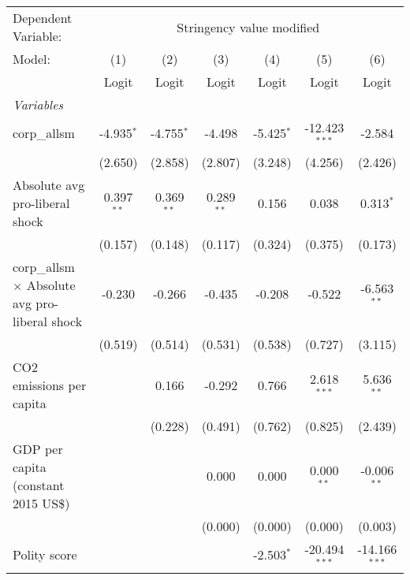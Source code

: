 
\begingroup
\centering
\begin{tabular}{lcccccc}
   \toprule
   Dependent Variable: & \multicolumn{6}{c}{Stringency value modified}\\
   Model:                                                & (1)          & (2)          & (3)          & (4)          & (5)             & (6)\\  
                                                         &  Logit       & Logit        & Logit        & Logit        & Logit           & Logit\\  
   \midrule
   \emph{Variables}\\
   corp\_allsm                                           & -4.935$^{*}$ & -4.755$^{*}$ & -4.498       & -5.425$^{*}$ & -12.423$^{***}$ & -2.584\\   
                                                         & (2.650)      & (2.858)      & (2.807)      & (3.248)      & (4.256)         & (2.426)\\   
   Absolute avg pro-liberal shock                        & 0.397$^{**}$ & 0.369$^{**}$ & 0.289$^{**}$ & 0.156        & 0.038           & 0.313$^{*}$\\   
                                                         & (0.157)      & (0.148)      & (0.117)      & (0.324)      & (0.375)         & (0.173)\\   
   corp\_allsm $\times$ Absolute avg pro-liberal shock   & -0.230       & -0.266       & -0.435       & -0.208       & -0.522          & -6.563$^{**}$\\   
                                                         & (0.519)      & (0.514)      & (0.531)      & (0.538)      & (0.727)         & (3.115)\\   
   CO2 emissions per capita                              &              & 0.166        & -0.292       & 0.766        & 2.618$^{***}$   & 5.636$^{**}$\\   
                                                         &              & (0.228)      & (0.491)      & (0.762)      & (0.825)         & (2.439)\\   
   GDP per capita (constant 2015 US\$)                   &              &              & 0.000        & 0.000        & 0.000$^{**}$    & -0.006$^{**}$\\   
                                                         &              &              & (0.000)      & (0.000)      & (0.000)         & (0.003)\\   
   Polity score                                          &              &              &              & -2.503$^{*}$ & -20.494$^{***}$ & -14.166$^{***}$\\   

\end{tabular}
